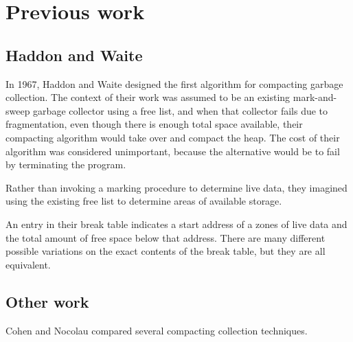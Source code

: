 \section{Previous work}

\subsection{Haddon and Waite}

In 1967, Haddon and Waite \cite{Haddon:1967} designed the first
algorithm for compacting garbage collection.  The context of their
work was assumed to be an existing mark-and-sweep garbage collector
using a free list, and when that collector fails due to fragmentation,
even though there is enough total space available, their compacting
algorithm would take over and compact the heap.  The cost of their
algorithm was considered unimportant, because the alternative would be
to fail by terminating the program.

Rather than invoking a marking procedure to determine live data, they
imagined using the existing free list to determine areas of available
storage. 

An entry in their break table indicates a start address of a zones of
live data and the total amount of free space below that address.
There are many different possible variations on the exact contents of
the break table, but they are all equivalent.

\subsection{Other work}

Cohen and Nocolau \cite{Cohen:1983:CCA:69575.357226} compared several
compacting collection techniques.

